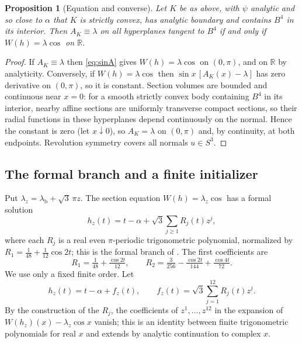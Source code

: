 \documentclass[11pt]{amsart}
\numberwithin{equation}{section}
\newtheorem{proposition}[theorem]{Proposition}
\theoremstyle{definition}
\theoremstyle{remark}
\newcommand{\R}{\mathbb{R}}
\newcommand{\lb}{\lambda_{\mathrm b}}
\begin{document}
\begin{proposition}[Equation and converse]\label{prop:d4eq}
Let $K$ be as above, with $\psi$ analytic and so close to $\alpha$ that $K$ is strictly convex, has analytic boundary and contains $B^4$ in its interior. Then $A_K\equiv\lambda$ on all hyperplanes tangent to $B^4$ if and only if $W(h)=\lambda\cos$ on $\R$.
\end{proposition}

\begin{proof}
If $A_K\equiv\lambda$ then \eqref{eq:sinA} gives $W(h)=\lambda\cos$ on $(0,\pi)$, and on $\R$ by analyticity. Conversely, if $W(h)=\lambda\cos$ then $\sin x\,[A_K(x)-\lambda]$ has zero derivative on $(0,\pi)$, so it is constant. Section volumes are bounded and continuous near $x=0$: for a smooth strictly convex body containing $B^4$ in its interior, nearby affine sections are uniformly transverse compact sections, so their radial functions in these hyperplanes depend continuously on the normal. Hence the constant is zero (let $x\downarrow0$), so $A_K=\lambda$ on $(0,\pi)$ and, by continuity, at both endpoints. Revolution symmetry covers all normals $u\in S^3$.
\end{proof}

\subsection{The formal branch and a finite initializer}\label{sec:formal}\label{sec:d4init}
Put $\lambda_z=\lb+\sqrt3\,\pi z$. The section equation $W(h)=\lambda_z\cos$ has a formal solution
\[
h_z(t)=t-\alpha+\sqrt3\sum_{j\ge1}R_j(t)z^j,
\]
where each $R_j$ is a real even $\pi$-periodic trigonometric polynomial, normalized by $R_1=\tfrac1{48}+\tfrac1{12}\cos2t$; this is the formal branch of \cite[Sections~3--5]{Had}. The first coefficients are
\begin{equation}\label{eq:R12}
R_1=\tfrac1{48}+\tfrac{\cos2t}{12},\qquad R_2=\tfrac3{256}-\tfrac{\cos2t}{144}+\tfrac{\cos4t}{72}.
\end{equation}
We use only a fixed finite order. Let
\begin{equation}\label{eq:hz}
h_z(t)=t-\alpha+f_z(t),\qquad f_z(t)=\sqrt3\sum_{j=1}^{12}R_j(t)z^j .
\end{equation}
By the construction of the $R_j$, the coefficients of $z^1,\dots,z^{12}$ in the expansion of $W(h_z)(x)-\lambda_z\cos x$ vanish; this is an identity between finite trigonometric polynomials for real $x$ and extends by analytic continuation to complex $x$.
\end{document}
